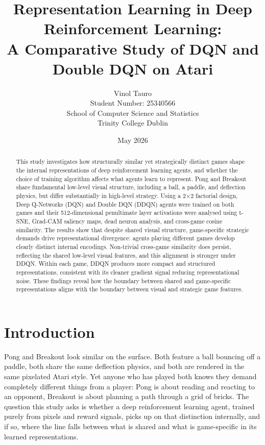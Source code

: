 \documentclass[a4paper]{article}
\begin{document}
\title{\textbf{Representation Learning in Deep Reinforcement Learning:}\\
       \large A Comparative Study of DQN and Double DQN on Atari}
\author{Vinol Tauro\\
        \small Student Number: 25340566\\
        \small School of Computer Science and Statistics\\
        \small Trinity College Dublin}
\date{May 2026}
\maketitle

\begin{abstract}
This study investigates how structurally similar yet strategically distinct games shape the internal representations of deep reinforcement learning agents, and whether the choice of training algorithm affects what agents learn to represent. Pong and Breakout share fundamental low-level visual structure, including a ball, a paddle, and deflection physics, but differ substantially in high-level strategy. Using a 2$\times$2 factorial design, Deep Q-Networks (DQN) and Double DQN (DDQN) agents were trained on both games and their 512-dimensional penultimate layer activations were analysed using t-SNE, Grad-CAM saliency maps, dead neuron analysis, and cross-game cosine similarity. The results show that despite shared visual structure, game-specific strategic demands drive representational divergence: agents playing different games develop clearly distinct internal encodings. Non-trivial cross-game similarity does persist, reflecting the shared low-level visual features, and this alignment is stronger under DDQN. Within each game, DDQN produces more compact and structured representations, consistent with its cleaner gradient signal reducing representational noise. These findings reveal how the boundary between shared and game-specific representations aligns with the boundary between visual and strategic game features.
\end{abstract}

\tableofcontents
\newpage

\section{Introduction}

Pong and Breakout look similar on the surface. Both feature a ball bouncing off a paddle, both share the same deflection physics, and both are rendered in the same pixelated Atari style. Yet anyone who has played both knows they demand completely different things from a player: Pong is about reading and reacting to an opponent, Breakout is about planning a path through a grid of bricks. The question this study asks is whether a deep reinforcement learning agent, trained purely from pixels and reward signals, picks up on that distinction internally, and if so, where the line falls between what is shared and what is game-specific in its learned representations.
\end{document}
